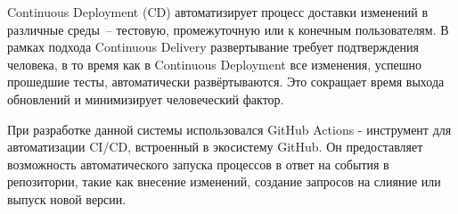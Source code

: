 Continuous Deployment (CD) автоматизирует процесс доставки изменений в различные среды~-- тестовую, промежуточную или к конечным пользователям. В рамках подхода Continuous Delivery развертывание требует подтверждения человека, в то время как в Continuous Deployment все изменения, успешно прошедшие тесты, автоматически развёртываются. Это сокращает время выхода обновлений и минимизирует человеческий фактор.

При разработке данной системы использовался GitHub Actions - инструмент для автоматизации CI/CD, встроенный в экосистему GitHub. Он предоставляет возможность автоматического запуска процессов в ответ на события в репозитории, такие как внесение изменений, создание запросов на слияние или выпуск новой версии.

\fi
